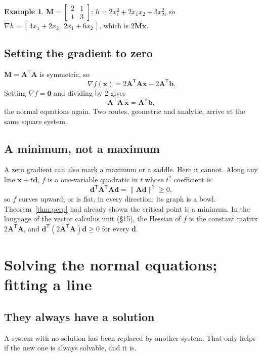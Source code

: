 \documentclass[11pt]{article}
\theoremstyle{plain}
\theoremstyle{definition}
\newtheorem{ex}{Example}[section]
\theoremstyle{remark}
\newcommand{\vc}[1]{\mathbf{#1}}
\newcommand{\mt}[1]{\mathbf{#1}}
\newcommand{\norm}[1]{\lVert #1\rVert}
\newcommand{\T}{^{\mathsf{T}}}
\newcommand{\xh}{\hat{\vc{x}}}
\begin{document}
\begin{ex}
$\mt{M}=\begin{bmatrix}2&1\\1&3\end{bmatrix}$: $h=2x_1^{2}+2x_1x_2+3x_2^{2}$, so
$\nabla h=[\,4x_1+2x_2,\ 2x_1+6x_2\,]$, which is $2\mt{M}\vc{x}$. \checkmark
\end{ex}

\subsection{Setting the gradient to zero}
$\mt{M}=\mt{A}\T\mt{A}$ is symmetric, so
\[
  \nabla f(\vc{x})=2\mt{A}\T\mt{A}\vc{x}-2\mt{A}\T\vc{b}.
\]
Setting $\nabla f=\vc{0}$ and dividing by $2$ gives
\[
  \mt{A}\T\mt{A}\,\xh=\mt{A}\T\vc{b},
\]
the normal equations again. Two routes, geometric and analytic, arrive at the
same square system.

\subsection{A minimum, not a maximum}
A zero gradient can also mark a maximum or a saddle. Here it cannot. Along any
line $\vc{x}+t\vc{d}$, $f$ is a one-variable quadratic in $t$ whose $t^{2}$
coefficient is
\[
  \vc{d}\T\mt{A}\T\mt{A}\vc{d}=\norm{\mt{A}\vc{d}}^{2}\ge0,
\]
so $f$ curves upward, or is flat, in every direction: its graph is a bowl.
Theorem~\ref{thm:perp} had already shown the critical point is a minimum. In
the language of the vector calculus unit (\S15), the Hessian of $f$ is the
constant matrix $2\mt{A}\T\mt{A}$, and $\vc{d}\T(2\mt{A}\T\mt{A})\vc{d}\ge0$ for
every $\vc{d}$.

\section{Solving the normal equations; fitting a line}

\subsection{They always have a solution}
A system with no solution has been replaced by another system. That only helps
if the new one is always solvable, and it is.
\end{document}
